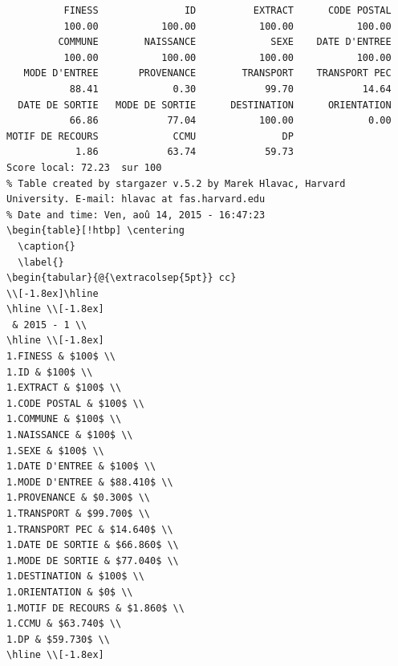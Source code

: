 \documentclass[]{article}
\begin{document}
\begin{verbatim}
          FINESS               ID          EXTRACT      CODE POSTAL 
          100.00           100.00           100.00           100.00 
         COMMUNE        NAISSANCE             SEXE    DATE D'ENTREE 
          100.00           100.00           100.00           100.00 
   MODE D'ENTREE       PROVENANCE        TRANSPORT    TRANSPORT PEC 
           88.41             0.30            99.70            14.64 
  DATE DE SORTIE   MODE DE SORTIE      DESTINATION      ORIENTATION 
           66.86            77.04           100.00             0.00 
MOTIF DE RECOURS             CCMU               DP 
            1.86            63.74            59.73 
Score local: 72.23  sur 100
% Table created by stargazer v.5.2 by Marek Hlavac, Harvard University. E-mail: hlavac at fas.harvard.edu
% Date and time: Ven, aoû 14, 2015 - 16:47:23
\begin{table}[!htbp] \centering 
  \caption{} 
  \label{} 
\begin{tabular}{@{\extracolsep{5pt}} cc} 
\\[-1.8ex]\hline 
\hline \\[-1.8ex] 
 & 2015 - 1 \\ 
\hline \\[-1.8ex] 
1.FINESS & $100$ \\ 
1.ID & $100$ \\ 
1.EXTRACT & $100$ \\ 
1.CODE POSTAL & $100$ \\ 
1.COMMUNE & $100$ \\ 
1.NAISSANCE & $100$ \\ 
1.SEXE & $100$ \\ 
1.DATE D'ENTREE & $100$ \\ 
1.MODE D'ENTREE & $88.410$ \\ 
1.PROVENANCE & $0.300$ \\ 
1.TRANSPORT & $99.700$ \\ 
1.TRANSPORT PEC & $14.640$ \\ 
1.DATE DE SORTIE & $66.860$ \\ 
1.MODE DE SORTIE & $77.040$ \\ 
1.DESTINATION & $100$ \\ 
1.ORIENTATION & $0$ \\ 
1.MOTIF DE RECOURS & $1.860$ \\ 
1.CCMU & $63.740$ \\ 
1.DP & $59.730$ \\ 
\hline \\[-1.8ex] 

\end{verbatim}
\end{document}
